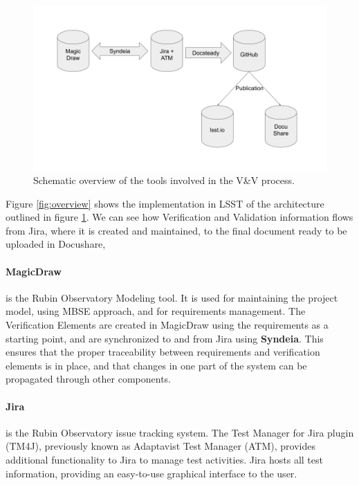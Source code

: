 \begin{figure}
\begin{center}
\includegraphics[width=\textwidth]{imgs/VandVtools.png}
 \caption{Schematic overview of the tools involved in the V\&V process.}
 \label{fig:vandvtools}
\end{center}
\end{figure}

Figure \ref{fig:overview} shows the implementation in LSST of the architecture outlined in figure \ref{fig:vandvtools}.
We can see how Verification and Validation information flows from Jira, where it is created and maintained,
to the final document ready to be uploaded in Docushare, 


\paragraph{MagicDraw}
is the Rubin Observatory Modeling tool. It is used for maintaining the project model,
using MBSE approach, and for requirements management.
The Verification Elements are created in MagicDraw using the requirements as a starting point,
and are synchronized to and from Jira using \textbf{Syndeia}.
This ensures that the proper traceability between requirements and verification elements is in place,
and that changes in one part of the system can be propagated through other components.

\paragraph{Jira}
is the Rubin Observatory issue tracking system.
The Test Manager for Jira plugin (TM4J), previously known as Adaptavist Test Manager (ATM),
provides additional functionality to Jira to manage test activities.
Jira hosts all test information, providing an easy-to-use graphical interface to the user.

